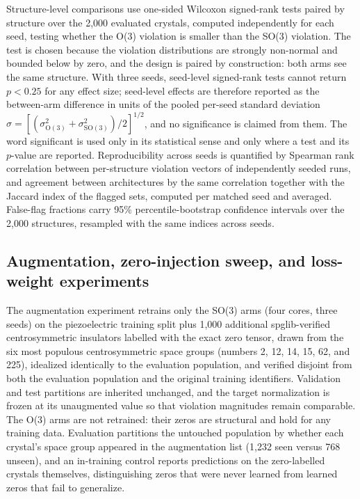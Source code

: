 Structure-level comparisons use one-sided Wilcoxon signed-rank tests paired by structure over the 2,000 evaluated crystals, computed independently for each seed, testing whether the O(3) violation is smaller than the SO(3) violation. The test is chosen because the violation distributions are strongly non-normal and bounded below by zero, and the design is paired by construction: both arms see the same structure. With three seeds, seed-level signed-rank tests cannot return $p<0.25$ for any effect size; seed-level effects are therefore reported as the between-arm difference in units of the pooled per-seed standard deviation $\sigma = [(\sigma_{\mathrm{O(3)}}^{2}+\sigma_{\mathrm{SO(3)}}^{2})/2]^{1/2}$, and no significance is claimed from them. The word significant is used only in its statistical sense and only where a test and its $p$-value are reported. Reproducibility across seeds is quantified by Spearman rank correlation between per-structure violation vectors of independently seeded runs, and agreement between architectures by the same correlation together with the Jaccard index of the flagged sets, computed per matched seed and averaged. False-flag fractions carry 95\% percentile-bootstrap confidence intervals over the 2,000 structures, resampled with the same indices across seeds.

\subsection*{Augmentation, zero-injection sweep, and loss-weight experiments}

The augmentation experiment retrains only the SO(3) arms (four cores, three seeds) on the piezoelectric training split plus 1,000 additional spglib-verified centrosymmetric insulators labelled with the exact zero tensor, drawn from the six most populous centrosymmetric space groups (numbers 2, 12, 14, 15, 62, and 225), idealized identically to the evaluation population, and verified disjoint from both the evaluation population and the original training identifiers. Validation and test partitions are inherited unchanged, and the target normalization is frozen at its unaugmented value so that violation magnitudes remain comparable. The O(3) arms are not retrained: their zeros are structural and hold for any training data. Evaluation partitions the untouched population by whether each crystal's space group appeared in the augmentation list (1,232 seen versus 768 unseen), and an in-training control reports predictions on the zero-labelled crystals themselves, distinguishing zeros that were never learned from learned zeros that fail to generalize.

